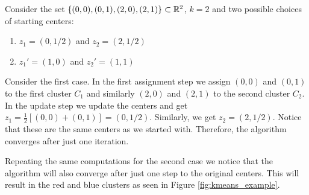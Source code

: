 \begin{example}{}{}
Consider the set $\{(0,0), (0,1), (2,0), (2,1)\} \subset \mathbb R^2$, $k = 2$ and two possible choices of starting centers:

\begin{enumerate}
    \item $z_1 = (0, 1/2)$ and $z_2 = (2, 1/2)$
    \item $z_1' = (1, 0)$ and $z_2' = (1, 1)$
\end{enumerate}

Consider the first case. In the first assignment step we assign $(0,0)$ and $(0,1)$ to the first cluster $C_1$ and similarly $(2,0)$ and $(2,1)$ to the second cluster $C_2$. In the update step we update the centers and get $z_1 = \frac{1}{2}\left[(0,0) + (0,1)\right] = (0,1/2)$. Similarly, we get $z_2 = (2,1/2)$. Notice that these are the same centers as we started with. Therefore, the algorithm converges after just one iteration.
\medskip

Repeating the same computations for the second case we notice that the algorithm will also converge after just one step to the original centers. This will result in the red and blue clusters as seen in Figure \ref{fig:kmeans_example}.


\begin{center}
\begin{minipage}{\linewidth}
\centering
\begin{minipage}[t]{0.45\textwidth}
    \centering
\end{minipage}
\end{minipage}
\end{center}
\end{example}
